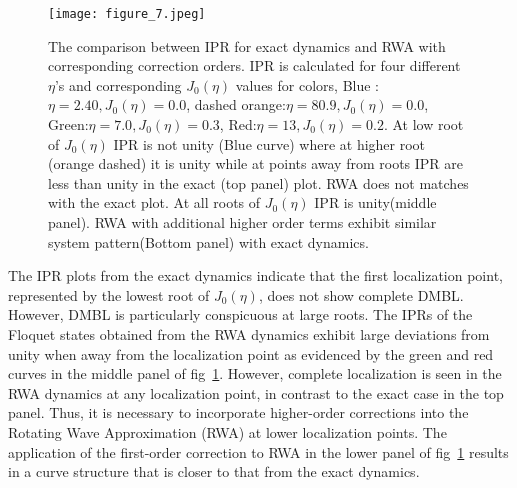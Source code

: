 \documentclass[%
reprint,
superscriptaddress,
amsmath,amssymb,
aps,
prb,
showkeys,
]{revtex4-2}
\providecommand{\DIFaddtex}[1]{{\protect\color{blue}\uwave{#1}}} %
\providecommand{\DIFaddbegin}{} %
\providecommand{\DIFaddend}{} %
\providecommand{\DIFaddbeginFL}{} %
\providecommand{\DIFaddendFL}{} %
\providecommand{\DIFdelbeginFL}{} %
\providecommand{\DIFdelendFL}{} %
\providecommand{\DIFadd}[1]{\texorpdfstring{\DIFaddtex{#1}}{#1}} %
\newcommand{\DIFscaledelfig}{0.5}
\newlength{\DIFdelgraphicswidth} %
\newlength{\DIFdelgraphicsheight} %
\newcommand{\DIFaddincludegraphics}[2][]{{\color{blue}\fbox{\DIFOincludegraphics[#1]{#2}}}} %
\newcommand{\DIFdelincludegraphics}[2][]{%
\sbox{\DIFdelgraphicsbox}{\DIFOincludegraphics[#1]{#2}}%
\settoboxwidth{\DIFdelgraphicswidth}{\DIFdelgraphicsbox} %
\settoboxtotalheight{\DIFdelgraphicsheight}{\DIFdelgraphicsbox} %
\scalebox{\DIFscaledelfig}{%
\parbox[b]{\DIFdelgraphicswidth}{\usebox{\DIFdelgraphicsbox}\\[-\baselineskip] \rule{\DIFdelgraphicswidth}{0em}}\llap{\resizebox{\DIFdelgraphicswidth}{\DIFdelgraphicsheight}{%
\setlength{\unitlength}{\DIFdelgraphicswidth}%
\begin{picture}(1,1)%
\thicklines\linethickness{2pt} %
{\color[rgb]{1,0,0}\put(0,0){\framebox(1,1){}}}%
{\color[rgb]{1,0,0}\put(0,0){\line( 1,1){1}}}%
{\color[rgb]{1,0,0}\put(0,1){\line(1,-1){1}}}%
\end{picture}%
}\hspace*{3pt}}} %
} %
\DeclareRobustCommand{\DIFaddbegin}{\DIFOaddbegin \let\includegraphics\DIFaddincludegraphics} %
\DeclareRobustCommand{\DIFaddend}{\DIFOaddend \let\includegraphics\DIFOincludegraphics} %
\DeclareRobustCommand{\DIFaddbeginFL}{\DIFOaddbeginFL \let\includegraphics\DIFaddincludegraphics} %
\DeclareRobustCommand{\DIFaddendFL}{\DIFOaddendFL \let\includegraphics\DIFOincludegraphics} %
\DeclareRobustCommand{\DIFdelbeginFL}{\DIFOdelbeginFL \let\includegraphics\DIFdelincludegraphics} %
\DeclareRobustCommand{\DIFdelendFL}{\DIFOaddendFL \let\includegraphics\DIFOincludegraphics} %
\begin{document}
\begin{figure}[t!]
	\centering
	\DIFdelbeginFL %
\DIFdelendFL \DIFaddbeginFL \texttt{[image: figure\_7.jpeg]}
	\DIFaddendFL \caption{The comparison between IPR for exact dynamics and RWA with corresponding correction orders. IPR is calculated for four different $\eta$'s and corresponding $J_0(\eta)$ values for colors, Blue :$\eta = 2.40, J_0(\eta) = 0.0$, dashed orange:$\eta = 80.9, J_0(\eta) = 0.0$, Green:$\eta =7.0, J_0(\eta) = 0.3$, Red:$\eta = 13, J_0(\eta)= 0. 2$. At low root of $J_0(\eta)$ IPR is not unity (Blue curve) where at higher root (orange dashed) it is unity while at points away from roots IPR are less than unity in the exact (top panel) plot. RWA does not matches with the exact plot. At all roots of $J_0(\eta)$ IPR is unity(middle panel). RWA with additional higher order terms exhibit similar system pattern(Bottom panel) with exact dynamics.}
	\label{fig:lmg_ipr_rwa11}
\end{figure}
The IPR plots from the exact dynamics indicate that the first localization point, represented by the lowest  root of $J_0(\eta)$, does not show complete DMBL. However, DMBL is particularly conspicuous at large roots. The IPRs of the Floquet states obtained from the RWA dynamics exhibit large deviations from unity when away from the localization point as evidenced by the green and red curves in the middle panel of fig\DIFaddbegin \DIFadd{.}\DIFaddend ~\ref{fig:lmg_ipr_rwa11}. However, complete localization is seen in the RWA dynamics at any localization point, in contrast to the exact case in the top panel. Thus, it is necessary to incorporate  higher-order corrections into the Rotating Wave Approximation (RWA) at lower localization points. The application of the first-order correction to RWA in the lower panel of fig\DIFaddbegin \DIFadd{.}\DIFaddend ~\ref{fig:lmg_ipr_rwa11} results in a curve structure that is closer to that from the exact dynamics.
\end{document}
